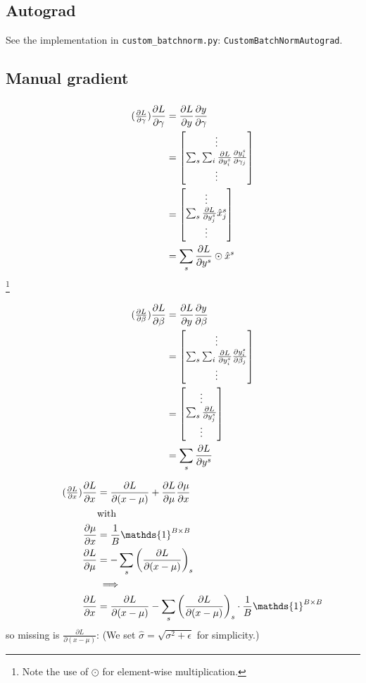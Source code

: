 \documentclass{article}
\newcommand\bM[1]{\ensuremath{\begin{bmatrix}#1\end{bmatrix}}}
\newcommand\·{\ensuremath{\cdot}}
\newcommand\…{\ensuremath{\dots}}
\renewcommand\t{\ensuremath{\times}}
\newcommand{\⇔}{\ensuremath{\iff}}
\newcommand{\⇐}{\ensuremath{\impliedby}}
\newcommand{\⇒}{\ensuremath{\implies}}
\newcommand\f[2]{\ensuremath{\frac{#1}{#2}}}
\newcommand\pf[2]{\ensuremath{\frac{\partial {#1}}{\partial {#2}}}}
\newcommand\1{\ensuremath{\mathds{1}}}
\newcommand\ℝ{\ensuremath{\mathds{R}}}
\begin{document}
\subsection{Autograd}
See the implementation in \texttt{custom\_batchnorm.py}: \texttt{CustomBatchNormAutograd}.

\subsection{Manual gradient}
\subsubsection{}
\begin{align*}
  \tag{$\pf{L}{\gamma}$}
  \pf{L}{\gamma}
  &= \pf{L}{y} \pf{y}{\gamma}\\
  &= \bM{\vdots\\ \sum_s\sum_i \pf{L}{y_i^s} \pf{y_i^s}{\gamma_j}\\\vdots}\\
  &= \bM{\vdots\\ \sum_s\pf{L}{y_j^s} \hat{x}_j^s\\\vdots}\\
  &= \sum_s \pf{L}{y^s}\odot\hat{x}^s
\end{align*}
\footnote{Note the use of $\odot$ for element-wise multiplication.}

\begin{align*}
  \tag{$\pf{L}{\beta}$}
  \pf{L}{\beta}
  &= \pf{L}{y} \pf{y}{\beta}\\
  &= \bM{\vdots\\ \sum_s\sum_i \pf{L}{y_i^s} \pf{y_i^s}{\beta_j}\\ \vdots}\\
  &= \bM{\vdots\\ \sum_s\pf{L}{y_j^s} \\\vdots}\\
  &= \sum_s\pf{L}{y^s}
\end{align*}

\begin{align*}
  \tag{\pf{L}{x}}
  \pf{L}{x} &= \pf{L}{(x-\mu)} + \pf{L}{\mu}\pf{\mu}{x}\\
  &\text{with}\\
  \pf{\mu}{x} &= \f{1}{B}\1^{B\t B}\\
  \pf{L}{\mu} &= -\sum_s\left(\pf{L}{(x-\mu)}\right)_s\\
  &\⇒\\
  \pf{L}{x} &= \pf{L}{(x-\mu)} -\sum_s\left(\pf{L}{(x-\mu)}\right)_s\·\f{1}{B}\1^{B\t B}
\end{align*}
so missing is $\pf{L}{(x-\mu)}$: (We set $\hat{\sigma} = \sqrt{\sigma^2 + \epsilon}$ for simplicity.)
\end{document}
